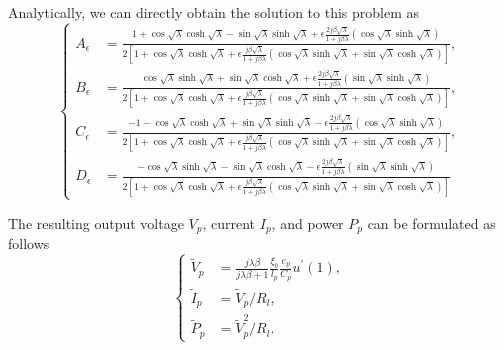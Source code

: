 \documentclass{article}
\begin{document}
Analytically, we can directly obtain the solution to this problem as 
\begin{equation}
    \left\{\begin{aligned}
        A_\epsilon &= \frac{ 1 + \cos\sqrt{\lambda } \cosh\sqrt{\lambda } - \sin\sqrt{\lambda } \sinh\sqrt{\lambda} + \epsilon \frac{2 j \beta \sqrt{\lambda}}{ 1+ j \beta \lambda } \left( \cos\sqrt{\lambda } \sinh\sqrt{\lambda } \right)}{2 \left[ 1 + \cos\sqrt{\lambda } \cosh\sqrt{\lambda } + \epsilon\frac{j \beta \sqrt{\lambda}}{ 1+ j \beta \lambda } \left( \cos\sqrt{\lambda } \sinh\sqrt{\lambda } + \sin\sqrt{\lambda } \cosh\sqrt{\lambda } \right) \right]}, \\
        B_\epsilon &= \frac{ \cos\sqrt{\lambda } \sinh\sqrt{\lambda } + \sin\sqrt{\lambda } \cosh\sqrt{\lambda} + \epsilon \frac{2 j \beta \sqrt{\lambda}}{ 1+ j \beta \lambda } \left( \sin\sqrt{\lambda } \sinh\sqrt{\lambda } \right)}{2 \left[ 1 + \cos\sqrt{\lambda } \cosh\sqrt{\lambda } + \epsilon\frac{j \beta \sqrt{\lambda}}{ 1+ j \beta \lambda } \left( \cos\sqrt{\lambda } \sinh\sqrt{\lambda } + \sin\sqrt{\lambda } \cosh\sqrt{\lambda } \right) \right]}, \\
        C_\epsilon &= \frac{ -1 - \cos\sqrt{\lambda } \cosh\sqrt{\lambda } + \sin\sqrt{\lambda } \sinh\sqrt{\lambda} - \epsilon \frac{2 j \beta \sqrt{\lambda}}{ 1+ j \beta \lambda } \left( \cos\sqrt{\lambda } \sinh\sqrt{\lambda } \right)}{2 \left[ 1 + \cos\sqrt{\lambda } \cosh\sqrt{\lambda } + \epsilon\frac{j \beta \sqrt{\lambda}}{ 1+ j \beta \lambda } \left( \cos\sqrt{\lambda } \sinh\sqrt{\lambda } + \sin\sqrt{\lambda } \cosh\sqrt{\lambda } \right) \right]}, \\
        D_\epsilon &= \frac{ -\cos\sqrt{\lambda } \sinh\sqrt{\lambda } - \sin\sqrt{\lambda } \cosh\sqrt{\lambda} - \epsilon \frac{2 j \beta \sqrt{\lambda}}{ 1+ j \beta \lambda } \left( \sin\sqrt{\lambda } \sinh\sqrt{\lambda } \right)}{2 \left[ 1 + \cos\sqrt{\lambda } \cosh\sqrt{\lambda } + \epsilon\frac{j \beta \sqrt{\lambda}}{ 1+ j \beta \lambda } \left( \cos\sqrt{\lambda } \sinh\sqrt{\lambda } + \sin\sqrt{\lambda } \cosh\sqrt{\lambda } \right) \right]}
    \end{aligned}\right.
\end{equation}


The resulting output voltage $V_p$, current $I_p$, and power $P_p$ can be formulated as follows
\begin{equation}
    \left\{\begin{aligned}
        \tilde{V}_p &= \frac{j \lambda \beta}{j \lambda \beta + 1} \frac{\xi_b}{l_p} \frac{e_p}{C_p} u^\prime(1), \\
        \tilde{I}_p &=  \tilde{V}_p / R_l, \\
        \tilde{P}_p &=  \tilde{V}_p^2 / R_l.
    \end{aligned}\right.
\end{equation}
\end{document}
